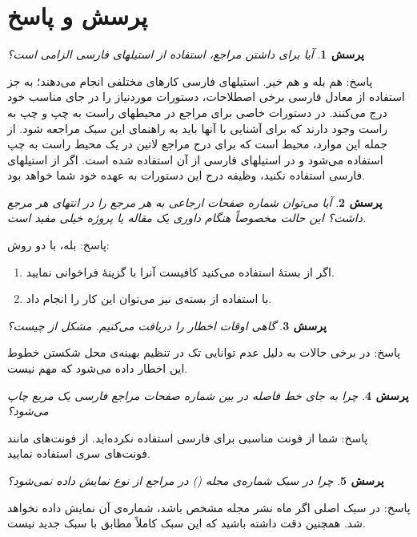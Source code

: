 \documentclass[a4paper]{article}
\theoremstyle{plain}\newtheorem{question}{پرسش}
\newcommand{\answer}{{\noindent \Sayeh پاسخ: }}
\newcommand\SLASH{\char`\\}
\begin{document}
\section{پرسش و پاسخ} 
\begin{question}
 آیا برای داشتن مراجع، استفاده از استیلهای فارسی الزامی است؟
\end{question}
\answer
هم بله و هم خیر. استیلهای فارسی کارهای مختلفی انجام می‌دهند؛ به جز استفاده از معادل فارسی برخی اصطلاحات، دستورات موردنیاز را در جای مناسب خود درج می‌کنند. در  دستورات خاصی برای مراجع در محیطهای راست به چپ و چپ به راست وجود دارند که برای آشنایی با آنها باید به راهنمای این سبک مراجعه شود. از جمله این موارد، محیط  است که برای درج مراجع لاتین در یک محیط راست به چپ استفاده می‌شود و در استیلهای فارسی از آن استفاده شده است. اگر از استیلهای فارسی استفاده نکنید، وظیفه درج این دستورات به عهده خود شما خواهد  بود.

\begin{question} آیا می‌توان شماره صفحات ارجاعی به هر مرجع را در انتهای هر مرجع داشت؟ این حالت مخصوصاً هنگام‌ داوری یک مقاله یا پروژه 
خیلی مفید است.
\end{question}
\answer
بله، با دو روش:
\begin{enumerate}
\item
اگر از بستهٔ  استفاده می‌کنید کافیست آنرا با گزینهٔ  فراخوانی نمایید.
\item
با استفاده از بسته‌ی  نیز می‌توان این کار را انجام داد.
\end{enumerate}

\begin{question} گاهی اوقات اخطار \lr{Underfull \SLASH hbox} را دریافت می‌کنیم. مشکل از چیست؟ \end{question}
\answer در برخی حالات به دلیل عدم توانایی تک در تنظیم بهینه‌ی محل شکستن خطوط این اخطار داده می‌شود که مهم نیست.

\begin{question} چرا به جای خط فاصله در بین شماره صفحات مراجع فارسی یک مربع چاپ می‌شود؟ \end{question}
\answer شما از فونت‌ مناسبی برای فارسی استفاده نکرده‌اید. از فونت‌های مانند فونت‌های سری  استفاده نمایید. 

\begin{question} چرا در سبک   شماره‌ی مجله () در مراجع از نوع  نمایش داده نمی‌شود؟ \end{question}
\answer در سبک اصلی  اگر ماه نشر مجله مشخص باشد، شماره‌ی آن نمایش داده نخواهد شد.
 همچنین دقت داشته باشید که این سبک کاملاً مطابق با سبک جدید  نیست.
\end{document}

